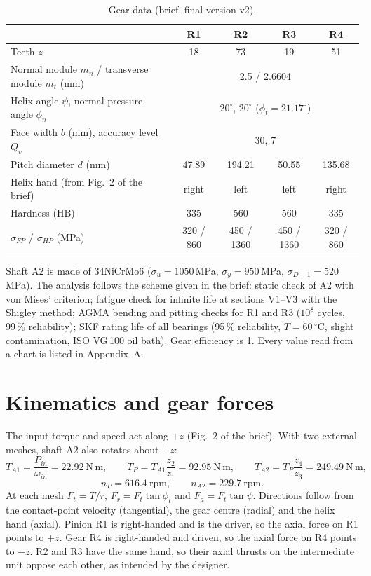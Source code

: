 \documentclass[11pt,a4paper]{article}
\begin{document}
\begin{table}[H]\centering\small
\caption{Gear data (brief, final version v2).}
\begin{tabular}{lcccc}\toprule
 & R1 & R2 & R3 & R4\\\midrule
Teeth $z$ & 18 & 73 & 19 & 51\\
Normal module $m_n$ / transverse module $m_t$ (mm) & \multicolumn{4}{c}{2.5 / 2.6604}\\
Helix angle $\psi$, normal pressure angle $\phi_n$ & \multicolumn{4}{c}{$20^\circ$, $20^\circ$ \quad($\phi_t=21.17^\circ$)}\\
Face width $b$ (mm), accuracy level $Q_v$ & \multicolumn{4}{c}{30, 7}\\
Pitch diameter $d$ (mm) & 47.89 & 194.21 & 50.55 & 135.68\\
Helix hand (from Fig.~2 of the brief) & right & left & left & right\\
Hardness (HB) & 335 & 560 & 560 & 335\\
$\sigma_{FP}$ / $\sigma_{HP}$ (MPa) & 320 / 860 & 450 / 1360 & 450 / 1360 & 320 / 860\\\bottomrule
\end{tabular}\end{table}

Shaft A2 is made of 34NiCrMo6 ($\sigma_u=1050$\,MPa, $\sigma_y=950$\,MPa, $\sigma_{D-1}=520$\,MPa). The analysis follows the scheme given in the brief: static check of A2 with von Mises' criterion; fatigue check for infinite life at sections V1--V3 with the Shigley method; AGMA bending and pitting checks for R1 and R3 ($10^8$ cycles, 99\,\% reliability); SKF rating life of all bearings (95\,\% reliability, $T=60\,^\circ$C, slight contamination, ISO VG\,100 oil bath). Gear efficiency is 1. Every value read from a chart is listed in Appendix~A.

\section{Kinematics and gear forces}
The input torque and speed act along $+z$ (Fig.~2 of the brief). With two external meshes, shaft A2 also rotates about $+z$:
\[
T_{A1}=\frac{P_{in}}{\omega_{in}}=22.92\ \mathrm{N\,m},\qquad
T_{P}=T_{A1}\frac{z_2}{z_1}=92.95\ \mathrm{N\,m},\qquad
T_{A2}=T_{P}\frac{z_4}{z_3}=249.49\ \mathrm{N\,m},
\]
\[
n_P=616.4\ \mathrm{rpm},\qquad n_{A2}=229.7\ \mathrm{rpm}.
\]
At each mesh $F_t=T/r$, $F_r=F_t\tan\phi_t$ and $F_a=F_t\tan\psi$. Directions follow from the contact-point velocity (tangential), the gear centre (radial) and the helix hand (axial). Pinion R1 is right-handed and is the driver, so the axial force on R1 points to $+z$. Gear R4 is right-handed and driven, so the axial force on R4 points to $-z$. R2 and R3 have the same hand, so their axial thrusts on the intermediate unit oppose each other, as intended by the designer.
\end{document}
